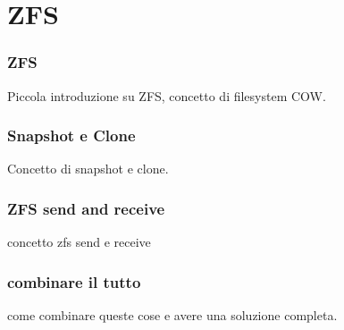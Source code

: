 \documentclass{beamer}
\begin{document}
\section{ZFS}
\begin{frame}
\frametitle{ZFS}
Piccola introduzione su ZFS, concetto di filesystem COW.
\end{frame}

\begin{frame}
\frametitle{Snapshot e Clone}
Concetto di snapshot e clone.
\end{frame}

\begin{frame}
\frametitle{ZFS send and receive}
concetto zfs send e receive
\end{frame}

\begin{frame}
\frametitle{combinare il tutto}
come combinare queste cose e avere una soluzione completa.
\end{frame}
\end{document}

